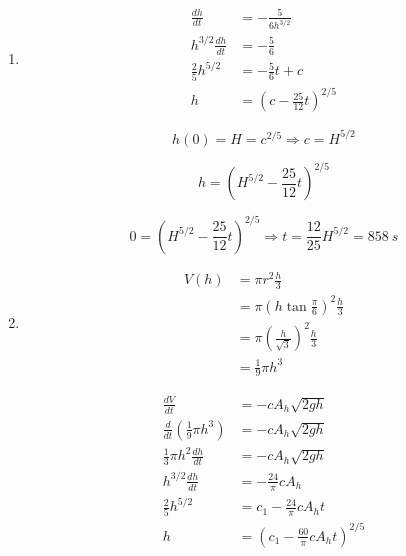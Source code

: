 \documentclass{article}
\begin{document}
\begin{enumerate}
  \item

        \begin{align*}
          \frac{dh}{dt}           & = -\frac{5}{6 h^{3 / 2}}                     \\
          h^{3 / 2} \frac{dh}{dt} & = -\frac{5}{6}                               \\
          \frac{2}{5} h^{5 / 2}   & = -\frac{5}{6} t + c                         \\
          h                       & = \left( c - \frac{25}{12} t \right)^{2 / 5}
        \end{align*}

        \[h(0) = H = c^{2 / 5} \Rightarrow c = H^{5 / 2}\]

        \[h = \left( H^{5 / 2} - \frac{25}{12} t \right)^{2 / 5}\]

        \[0 = \left( H^{5 / 2} - \frac{25}{12} t \right)^{2 / 5} \Rightarrow t = \frac{12}{25} H^{5 / 2} = \qty{858}{s}\]

  \item

        \begin{align*}
          V(h) & = \pi r^2 \frac{h}{3}                                   \\
               & = \pi \left( h \tan \frac{\pi}{6} \right)^2 \frac{h}{3} \\
               & = \pi \left( \frac{h}{\sqrt{3}} \right)^2 \frac{h}{3}   \\
               & = \frac{1}{9} \pi h^3
        \end{align*}

        \begin{align*}
          \frac{dV}{dt}                                   & = -c A_h \sqrt{2 g h}                                 \\
          \frac{d}{dt} \left( \frac{1}{9} \pi h^3 \right) & = -c A_h \sqrt{2 g h}                                 \\
          \frac{1}{3} \pi h^2 \frac{dh}{dt}               & = -c A_h \sqrt{2 g h}                                 \\
          h^{3 / 2} \frac{dh}{dt}                         & = -\frac{24}{\pi} c A_h                               \\
          \frac{2}{5} h^{5/2}                             & = c_1 - \frac{24}{\pi} c A_h t                        \\
          h                                               & = \left( c_1 - \frac{60}{\pi} c A_h t \right)^{2 / 5}
        \end{align*}


\end{enumerate}
\end{document}
